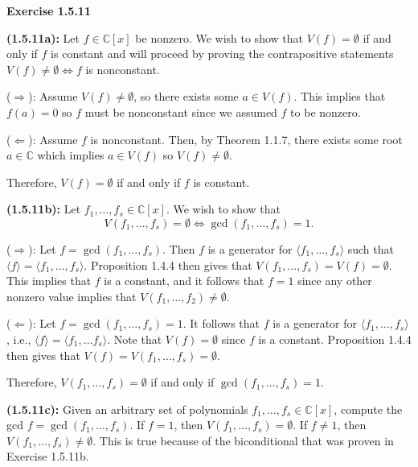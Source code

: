 \documentclass[12pt,oneside]{article}
\newenvironment{exercise}[1]{\vspace{.1in}\noindent\textbf{Exercise #1 \hspace{.05em}}}{}
\newcommand{\C}{\mathbb{C}}
\begin{document}
\newpage
\begin{exercise}{1.5.11}
    
    \bigskip
    \textbf{(1.5.11a):} Let $f \in \C[x]$ be nonzero. We wish to show that 
    $V(f) = \emptyset$ if and only if $f$ is constant and will proceed by 
    proving the contrapositive statements
    $V(f) \neq \emptyset \Leftrightarrow f$ is nonconstant.

    \bigskip
    ($\Rightarrow$): Assume $V(f) \neq \emptyset$, so there exists some 
    $a \in V(f)$. This implies that $f(a) = 0$ so $f$ must be nonconstant 
    since we assumed $f$ to be nonzero.

    \bigskip
    ($\Leftarrow$): Assume $f$ is nonconstant. Then, by Theorem 1.1.7, there
    exists some root $a \in \C$ which implies $a \in V(f)$ so $V(f) \neq \emptyset$.

    Therefore, $V(f) = \emptyset$ if and only if $f$ is constant.

    \bigskip
    \textbf{(1.5.11b):} Let $f_1,\ldots,f_s \in \C[x]$. We wish to show that 
    \[
        V(f_1,\ldots,f_s) = \emptyset \Leftrightarrow \gcd(f_1,\ldots,f_s) = 1.
    \]

    \bigskip
    ($\Rightarrow$): Let $f = \gcd(f_1,\ldots,f_s)$. Then $f$ is a generator for 
    $\langle f_1,\ldots,f_s \rangle$ such that $\langle f \rangle = \langle f_1,\ldots,f_s \rangle$.
    Proposition 1.4.4 then gives that $V(f_1,\ldots,f_s) = V(f) = \emptyset$. This 
    implies that $f$ is a constant, and it follows that $f=1$ since any other 
    nonzero value implies that $V(f_1,\ldots,f_2) \neq \emptyset$.

    \bigskip
    ($\Leftarrow$): Let $f = \gcd(f_1,\ldots,f_s) = 1$. It follows that $f$ 
    is a generator for $\langle f_1,\ldots,f_s \rangle$, i.e., $\langle f \rangle = \langle f_1,\ldots f_s \rangle$.
    Note that $V(f) = \emptyset$ since $f$ is a constant.
    Proposition 1.4.4 then gives that $V(f) = V(f_1,\ldots,f_s) = \emptyset$.

    Therefore, $V(f_1,\ldots,f_s) = \emptyset$ if and only if $\gcd(f_1,\ldots,f_s) = 1$.

    \bigskip
    \textbf{(1.5.11c):} Given an arbitrary set of polynomials $f_1,\ldots,f_s \in \C[x]$, 
    compute the gcd $f=\gcd(f_1,\ldots,f_s)$. If $f=1$, then $V(f_1,\ldots,f_s) = \emptyset$.
    If $f \neq 1$, then $V(f_1,\ldots,f_s) \neq \emptyset$. This is true because 
    of the biconditional that was proven in Exercise 1.5.11b.
\end{exercise}
\end{document}
